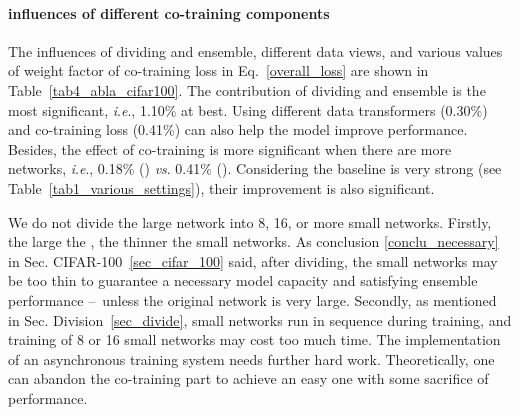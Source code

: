 \documentclass[lettersize,journal]{IEEEtran}
\newcommand{\ie}{\textit{i}.\textit{e}.}
\begin{document}
\paragraph{influences of different co-training components}
The influences of dividing and ensemble,
different data views, and various values of 
weight factor  of co-training loss
in Eq.~\eqref{overall_loss} are shown in Table~\ref{tab4_abla_cifar100}.
The contribution of dividing and ensemble is the most significant,
\ie, 1.10\% at best.
Using different data transformers (0.30\%)
and co-training loss (0.41\%) can also help the model improve
performance.
Besides, the effect of co-training is more significant when there are more networks,
\ie, 0.18\% () \textit{vs}. 0.41\% ().
Considering the baseline is very strong (see Table~\ref{tab1_various_settings}),
their improvement is also significant.


We do not divide the large network into 8, 16, or more small networks.
Firstly, the large the , the thinner the small networks. 
As conclusion \ref{conclu_necessary} in Sec. CIFAR-100~\ref{sec_cifar_100} said,
after dividing,
the small networks may be too thin to guarantee a necessary model capacity
and satisfying ensemble performance \---\ unless the original network is very large.
Secondly, as mentioned in Sec. Division~\ref{sec_divide}, small networks run in sequence during training,
and training of 8 or 16 small networks may cost too much time.
The implementation of an asynchronous training system needs further hard work.
Theoretically, one can abandon the co-training part to achieve an easy one
with some sacrifice of performance.
\end{document}
